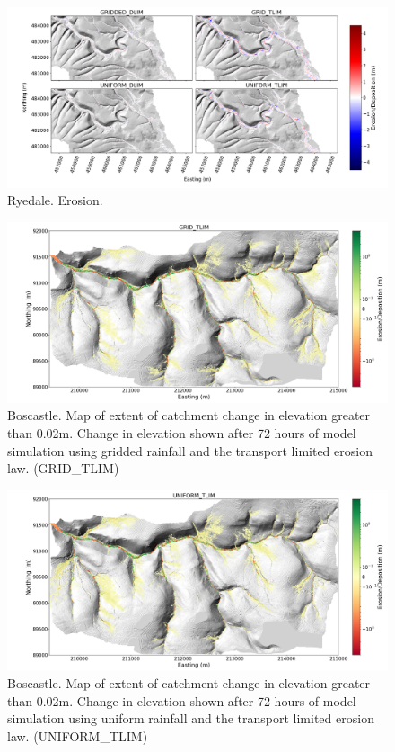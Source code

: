\begin{figure}
\includegraphics[width=25cm]{chp06_figures_scripts/figure_ryedale_erosion_diff_ensemble.png}
\caption{Ryedale. Erosion.}
\label{fig_ryedale_2dplan_erosion_ensemble}
\end{figure}

\begin{figure}
\includegraphics[width=25cm]{chp06_figures_scripts/boscastle_erodediff_grid_tlim.png}
\caption{Boscastle. Map of extent of catchment change in elevation greater than 0.02m. Change in elevation shown after 72 hours of model simulation using gridded rainfall and the transport limited erosion law. (GRID\_TLIM)}
\label{fig_boscastle_erodediff_grid_tlim}
\end{figure}

\begin{figure}
\includegraphics[width=25cm]{chp06_figures_scripts/boscastle_erodediff_uniform_tlim.png}
\caption{Boscastle. Map of extent of catchment change in elevation greater than 0.02m. Change in elevation shown after 72 hours of model simulation using uniform rainfall and the transport limited erosion law. (UNIFORM\_TLIM)}
\label{fig_boscastle_erodediff_uniform_tlim}
\end{figure}

